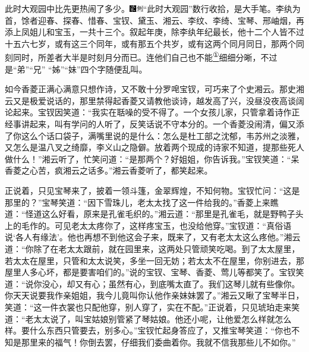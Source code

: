 此时大观园中比先更热闹了多少。{\includegraphics[width=3mm]{../Images/00006}\includegraphics[width=3mm]{../Images/00011}\footnotesize \kaishu ``此时大观园''数行收拾，是大手笔。}李纨为首，馀者迎春、探春、惜春、宝钗、黛玉、湘云、李纹、李绮、宝琴、邢岫烟，再添上凤姐儿和宝玉，一共十三个。叙起年庚，除李纨年纪最长，他十二个人皆不过十五六七岁，或有这三个同年，或有那五个共岁，或有这两个同月同日，那两个同刻同时，所差者大半是时刻月分而已。连他们自己也不能\href{../Text/part0053_split_000.html\#lnkback_1_a}{\textsuperscript{①}}细细分晰，不过是``弟''``兄''
``姊''``妹''四个字随便乱叫。

如今香菱正满心满意只想作诗，又不敢十分罗唣宝钗，可巧来了个史湘云。那史湘云又是极爱说话的，那里禁得起香菱又请教他谈诗，越发高了兴，没昼没夜高谈阔论起来。宝钗因笑道：``我实在聒噪的受不得了。一个女孩儿家，只管拿着诗作正经事讲起来，叫有学问的人听了，反笑话说不守本分的。一个香菱没闹清，偏又添了你这么个话口袋子，满嘴里说的是什么：怎么是杜工部之沈郁，韦苏州之淡雅，又怎么是温八叉之绮靡，李义山之隐僻。放着两个现成的诗家不知道，提那些死人做什么！''湘云听了，忙笑问道：``是那两个？好姐姐，你告诉我。''宝钗笑道：``呆香菱之心苦，疯湘云之话多。''湘云香菱听了，都笑起来。

正说着，只见宝琴来了，披着一领斗篷，金翠辉煌，不知何物。宝钗忙问：``这是那里的？''宝琴笑道：``因下雪珠儿，老太太找了这一件给我的。''香菱上来瞧道：``怪道这么好看，原来是孔雀毛织的。''湘云道：``那里是孔雀毛，就是野鸭子头上的毛作的。可见老太太疼你了，这样疼宝玉，也没给他穿。''宝钗道：``真俗语说`各人有缘法'。他也再想不到他这会子来，既来了，又有老太太这么疼他。''湘云道：``你除了在老太太跟前，就在园里来，这两处只管顽笑吃喝。到了太太屋里，若太太在屋里，只管和太太说笑，多坐一回无妨；若太太不在屋里，你别进去，那屋里人多心坏，都是要害咱们的。''说的宝钗、宝琴、香菱、莺儿等都笑了。宝钗笑道：``说你没心，却又有心；虽然有心，到底嘴太直了。我们这琴儿就有些像你。你天天说要我作亲姐姐，我今儿竟叫你认他作亲妹妹罢了。''湘云又瞅了宝琴半日，笑道：``这一件衣裳也只配他穿，别人穿了，实在不配。''正说着，只见琥珀走来笑道：``老太太说了，叫宝姑娘别管紧了琴姑娘。他还小呢，让他爱怎么样就怎么样。要什么东西只管要去，别多心。''宝钗忙起身答应了，又推宝琴笑道：``你也不知是那里来的福气！你倒去罢，仔细我们委曲着你。我就不信我那些儿不如你。''

